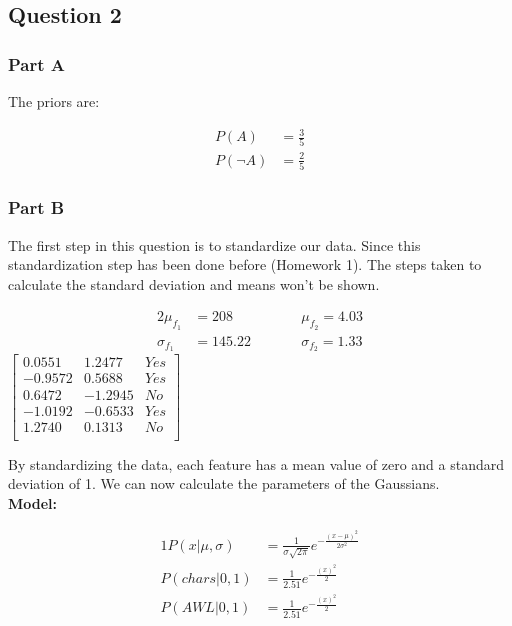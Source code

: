 \documentclass[12pt]{article}
\begin{document}
\newpage
\subsection{Question 2}
\subsubsection{Part A}

\noindent
The priors are:

\begin{center}
    \begin{align*}
        P(A) &= \frac{3}{5}\\
        P(\neg A) &= \frac{2}{5}
    \end{align*}
\end{center}

\subsubsection{Part B}

\noindent
The first step in this question is to standardize our data. Since this standardization step has been done before (Homework 1). The steps taken to calculate the standard deviation and means won't be shown.

\begin{center}
    \begin{alignat*}{2}
        \mu_{f_1} &= 208 \qquad &&\mu_{f_2} = 4.03 \\ 
        \sigma_{f_1} &= 145.22 \qquad &&\sigma_{f_2} = 1.33
    \end{alignat*}
    $\begin{bmatrix}   
        0.0551 &	1.2477 & Yes \\
        -0.9572 &	0.5688 & Yes \\
        0.6472 &	-1.2945 & No \\
        -1.0192 &	-0.6533 & Yes \\
        1.2740 &	0.1313 & No \\
    \end{bmatrix}$
\end{center}


\noindent
By standardizing the data, each feature has a mean value of zero and a standard deviation of 1.  
We can now calculate the parameters of the Gaussians.
\\[0.1 in]
\noindent
\textbf{Model: }
\begin{center}
    \begin{alignat*}{1}
        P(x|\mu, \sigma) &= \frac{1}{\sigma \sqrt{2\pi}} e^{-\frac{(x-\mu)^2}{2\sigma^2}} \\
        P(chars|0,1) &= \frac{1}{2.51} e^{-\frac{(x)^2}{2}}\\
        P(AWL|0,1) &= \frac{1}{2.51} e^{-\frac{(x)^2}{2}}
    \end{alignat*}
\end{center}
\end{document}
